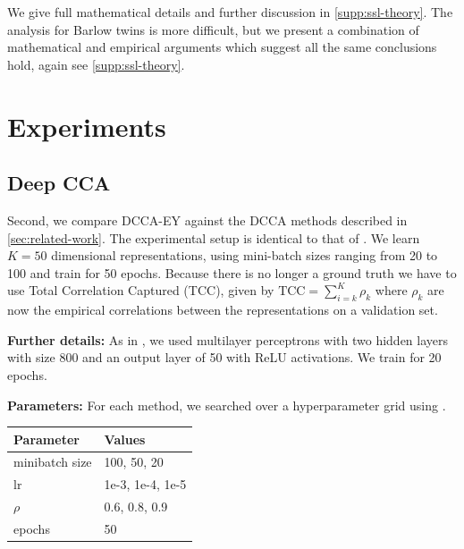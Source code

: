 We give full mathematical details and further discussion in \cref{supp:ssl-theory}.
The analysis for Barlow twins is more difficult, but we present a combination of mathematical and empirical arguments which suggest all the same conclusions hold, again see \cref{supp:ssl-theory}.

\section{Experiments}\label{Experiments}


\subsection{Deep CCA}\label{sec:experiments-DCCA}
Second, we compare DCCA-EY against the DCCA methods described in \cref{sec:related-work}. The experimental setup is identical to that of \cite{wang2015stochastic}.
We learn $K=50$ dimensional representations, using mini-batch sizes ranging from 20 to 100 and train for 50 epochs.
Because there is no longer a ground truth we have to use Total Correlation Captured (TCC), given by \( \text{TCC} = \sum_{i=k}^K \rho_k \) where $\rho_k$ are now the empirical correlations between the representations on a validation set.

\textbf{Further details:} As in \citet{wang2015stochastic}, we used multilayer perceptrons with two hidden layers with size 800 and an output layer of 50 with ReLU activations. We train for 20 epochs.

\textbf{Parameters:} For each method, we searched over a hyperparameter grid using \citet{wandb}.

\begin{table}[h!]
    \centering
    \begin{tabular}{|l|l|}
        \hline Parameter           & Values           \\
        \hline minibatch size      & 100, 50, 20      \\
        \hline lr                  & 1e-3, 1e-4, 1e-5 \\
        \hline $\rho$\footnotemark & 0.6, 0.8, 0.9    \\
        \hline epochs              & 50               \\
        \hline
    \end{tabular}
\end{table}


